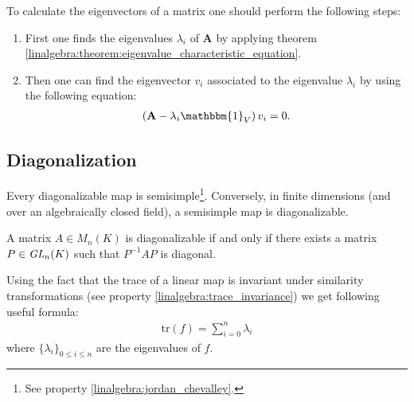     \begin{method}
        To calculate the eigenvectors of a matrix one should perform the following steps:
        \begin{enumerate}
            \item First one finds the eigenvalues $\lambda_i$ of $\mathbf{A}$ by applying theorem \ref{linalgebra:theorem:eigenvalue_characteristic_equation}.
            \item Then one can find the eigenvector $v_i$ associated to the eigenvalue $\lambda_i$ by using the following equation:
                \begin{gather}
                    \label{linalgebra:eigenvectors:eigenspace}
                    \left(\mathbf{A} - \lambda_i\mathbbm{1}_V\right)v_i = 0.
                \end{gather}
        \end{enumerate}
    \end{method}

\subsection{Diagonalization}

    \begin{property}
        Every diagonalizable map is semisimple\footnote{See property \ref{linalgebra:jordan_chevalley}.}. Conversely, in finite dimensions (and over an algebraically closed field), a semisimple map is diagonalizable.
    \end{property}

    \begin{theorem}\label{linalgebra:theorem:diagonalizable_PQP}
        A matrix $A\in M_n(K)$ is diagonalizable if and only if there exists a matrix $P\in\emph{GL}_n(K)$ such that $P^{-1}AP$ is diagonal.
    \end{theorem}
    \begin{result}
        Using the fact that the trace of a linear map is invariant under similarity transformations (see property \ref{linalgebra:trace_invariance}) we get following useful formula:
        \begin{gather}
            \text{tr}(f) = \sum_{i=0}^n\lambda_i
        \end{gather}
        where $\{\lambda_i\}_{0\leq i\leq n}$ are the eigenvalues of $f$.
    \end{result}

